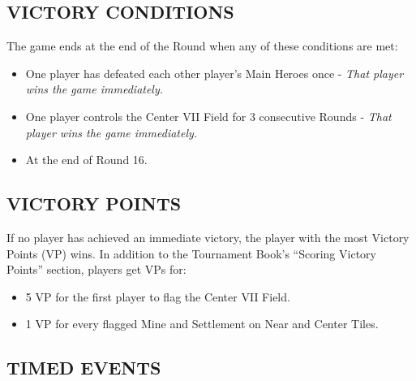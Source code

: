 \begin{multicols}{2}
\subsection*{\MakeUppercase{Victory Conditions}}
The game ends at the end of the Round when any of these conditions are met:

\begin{itemize}
  \item One player has defeated each other player's Main Heroes once - \textit{That player wins the game immediately.}
  \item One player controls the Center VII Field for 3 consecutive Rounds - \textit{That player wins the game immediately.}
  \item At the end of Round 16.
\end{itemize}

\subsection*{\MakeUppercase{Victory Points}}
If no player has achieved an immediate victory, the player with the most Victory Points (VP) wins.
In addition to the Tournament Book's ``Scoring Victory Points'' section, players get VPs for:

\begin{itemize}
  \item 5 VP for the first player to flag the Center VII Field.
  \item 1 VP for every flagged Mine and Settlement on Near and Center Tiles.
\end{itemize}

\subsection*{\MakeUppercase{Timed Events}}


\end{multicols}
